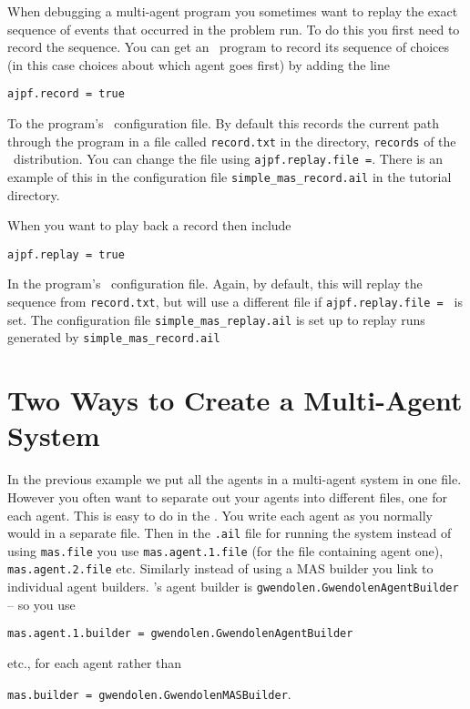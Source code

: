 When debugging a multi-agent program you sometimes want to replay the exact sequence of events that occurred in the  problem run.  To do this you first need to record the sequence.  You can get an \ail\ program to record its sequence of choices (in this case choices about which agent goes first) by adding the line

\begin{verbatim}
ajpf.record = true
\end{verbatim}

To the program's \ail\ configuration file.  By default this records the current path through the program in a file called \texttt{record.txt} in the directory, \texttt{records} of the \mcapl\ distribution.  You can change the file using \texttt{ajpf.replay.file =}.  There is an example of this in the configuration file \texttt{simple\_mas\_record.ail} in the tutorial directory.

When you want to play back a record then include 

\begin{verbatim}
ajpf.replay = true
\end{verbatim}

In the program's \ail\ configuration file.  Again, by default, this will replay the sequence from \texttt{record.txt}, but will use a different file if \texttt{ajpf.replay.file = } is set.  The configuration file \texttt{simple\_mas\_replay.ail} is set up to replay runs generated by \texttt{simple\_mas\_record.ail}

\section{Two Ways to Create a Multi-Agent System}

\begin{sloppypar}
In the previous example we put all the agents in a multi-agent system in one file.  However you often want to separate out your agents into different files, one for each agent.  This is easy to do in the \ail.  You write each agent as you normally would in a separate file.  Then in the \texttt{.ail} file for running the system instead of using \texttt{mas.file} you use \texttt{mas.agent.1.file} (for the file containing agent one), \texttt{mas.agent.2.file} etc.  Similarly instead of using a MAS builder you link to individual agent builders.  \gwendolen's agent builder is \texttt{gwendolen.GwendolenAgentBuilder} -- so you use 
\end{sloppypar}
\begin{center}
\texttt{mas.agent.1.builder = gwendolen.GwendolenAgentBuilder} 
\end{center}
etc., for each agent rather than 
\begin{center}
\texttt{mas.builder = gwendolen.GwendolenMASBuilder}.
\end{center}

